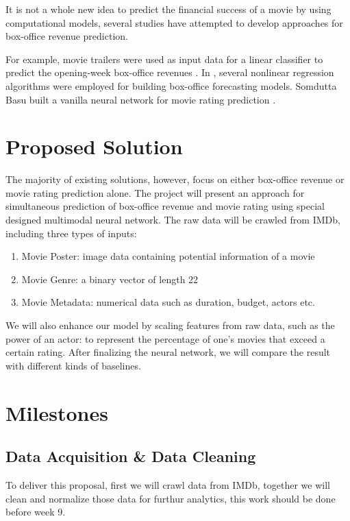 \documentclass[conference]{IEEEtran}
\begin{document}
It is not a whole new idea to predict the financial success of a movie by using computational models, several studies have attempted to develop approaches for box-office revenue prediction.

For example, movie trailers were used as input data for a linear classifier to predict the opening-week box-office revenues \cite{trailer}. In \cite{boxoffice}, several nonlinear regression algorithms were employed for building box-office forecasting models. Somdutta Basu built a vanilla neural network for movie rating prediction \cite{rating}.

\section{Proposed Solution}

The majority of existing solutions, however, focus on either box-office revenue or movie rating prediction alone. The project will present an approach for simultaneous prediction of box-office revenue and movie rating using special designed multimodal neural network. The raw data will be crawled from IMDb, including three types of inputs:

\begin{enumerate}
  \item Movie Poster: image data containing potential information of a movie
  \item Movie Genre: a binary vector of length 22
  \item Movie Metadata: numerical data such as duration, budget, actors etc.
\end{enumerate}

We will also enhance our model by scaling features from raw data, such as the power of an actor: to represent the percentage of one's movies that exceed a certain rating. After finalizing the neural network, we will compare the result with different kinds of baselines.

\section{Milestones}

\subsection{Data Acquisition \& Data Cleaning}

To deliver this proposal, first we will crawl data from IMDb, together we will clean and normalize those data for furthur analytics, this work should be done before week 9.
\end{document}
